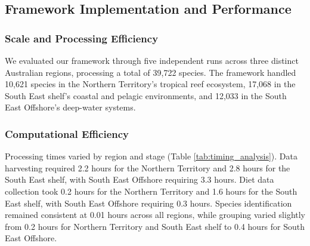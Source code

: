 \subsection{Framework Implementation and Performance}

\subsubsection{Scale and Processing Efficiency}
We evaluated our framework through five independent runs across three distinct Australian regions, processing a total of 39,722 species. The framework handled 10,621 species in the Northern Territory's tropical reef ecosystem, 17,068 in the South East shelf's coastal and pelagic environments, and 12,033 in the South East Offshore's deep-water systems. 

\subsubsection{Computational Efficiency}



Processing times varied by region and stage (Table \ref{tab:timing_analysis}). Data harvesting required 2.2 hours for the Northern Territory and 2.8 hours for the South East shelf, with South East Offshore requiring 3.3 hours. Diet data collection took 0.2 hours for the Northern Territory and 1.6 hours for the South East shelf, with South East Offshore requiring 0.3 hours. Species identification remained consistent at 0.01 hours across all regions, while grouping varied slightly from 0.2 hours for Northern Territory and South East shelf to 0.4 hours for South East Offshore.
